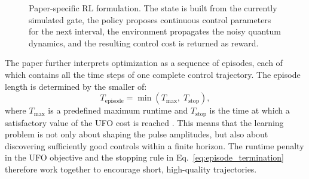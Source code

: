 \tikzexternaldisable
\begin{figure}[t]
\centering
\caption{Paper-specific RL formulation. The state is built from the currently simulated gate, the policy proposes continuous control parameters for the next interval, the environment propagates the noisy quantum dynamics, and the resulting control cost is returned as reward.}
\label{fig:paper_rl_loop}
\end{figure}
\tikzexternalenable

The paper further interprets optimization as a sequence of episodes, each of which contains all the time steps of one complete control trajectory. The episode length is determined by the smaller of:
\begin{equation}
T_{\mathrm{episode}}
=
\min\!\left(
T_{\max},\;
T_{\mathrm{stop}}
\right),
\label{eq:episode_termination}
\end{equation}
where \(T_{\max}\) is a predefined maximum runtime and \(T_{\mathrm{stop}}\) is the time at which a satisfactory value of the UFO cost is reached \cite{Niu2019}. This means that the learning problem is not only about shaping the pulse amplitudes, but also about discovering sufficiently good controls within a finite horizon. The runtime penalty in the UFO objective and the stopping rule in Eq.~\eqref{eq:episode_termination} therefore work together to encourage short, high-quality trajectories.

